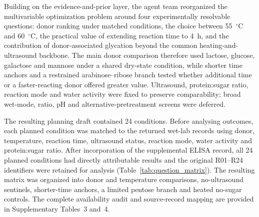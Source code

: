 Building on the evidence-and-prior layer, the agent team reorganized the multivariable optimization problem around four experimentally resolvable questions: donor ranking under matched conditions, the choice between 55~$^\circ$C and 60~$^\circ$C, the practical value of extending reaction time to 4~h, and the contribution of donor-associated glycation beyond the common heating-and-ultrasound backbone. The main donor comparison therefore used lactose, glucose, galactose and mannose under a shared dry-state condition, while shorter time anchors and a restrained arabinose--ribose branch tested whether additional time or a faster-reacting donor offered greater value. Ultrasound, protein:sugar ratio, reaction mode and water activity were fixed to preserve comparability; broad wet-mode, ratio, pH and alternative-pretreatment screens were deferred.

The resulting planning draft contained 24 conditions. Before analysing outcomes, each planned condition was matched to the returned wet-lab records using donor, temperature, reaction time, ultrasound status, reaction mode, water activity and protein:sugar ratio. After incorporation of the supplemental ELISA record, all 24 planned conditions had directly attributable results and the original R01--R24 identifiers were retained for analysis (Table~\ref{tab:question_matrix}). The resulting matrix was organized into donor and temperature comparisons, no-ultrasound sentinels, shorter-time anchors, a limited pentose branch and heated no-sugar controls. The complete availability audit and source-record mapping are provided in Supplementary Tables~3 and~4.


